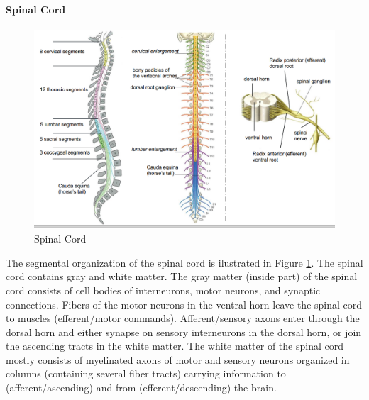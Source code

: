 \documentclass[12pt,article,oneside,a4paper]{memoir}
\begin{document}
\paragraph{Spinal Cord}
\begin{figure}
	\centering
  	\includegraphics[width=\linewidth]{imgs/spinalCord.png}
	\caption{Spinal Cord}
  	\label{fig:spinalCord}
\end{figure}

The segmental organization of the spinal cord is ilustrated in Figure \ref{fig:spinalCord}. The spinal cord contains gray and white matter. 
The gray matter (inside part) of the spinal  cord consists of cell bodies of interneurons, motor neurons, and synaptic connections. Fibers of the motor neurons in the ventral horn leave the spinal cord to muscles (efferent/motor commands). Afferent/sensory axons enter through the dorsal horn and either synapse on sensory interneurons in the dorsal horn, or join the ascending tracts in the white matter.
The white matter of the spinal cord mostly consists of myelinated axons of motor and sensory neurons organized in columns (containing several fiber tracts) carrying information to (afferent/ascending) and from (efferent/descending) the brain.
\end{document}
